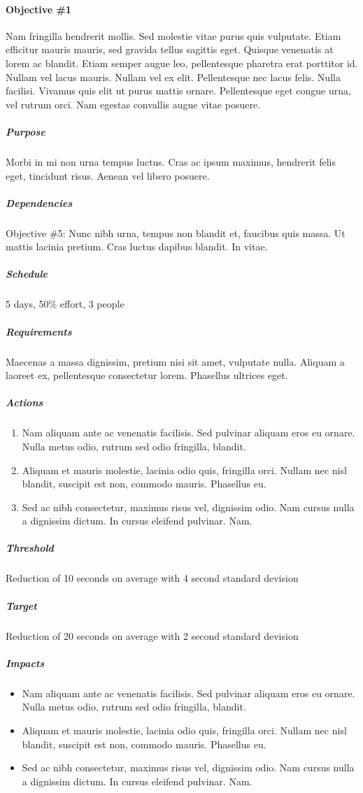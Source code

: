 		\paragraph{Objective \#1}
		Nam fringilla hendrerit mollis. Sed molestie vitae purus quis vulputate. Etiam efficitur mauris mauris, sed gravida tellus sagittis eget. Quisque venenatis at lorem ac blandit. Etiam semper augue leo, pellentesque pharetra erat porttitor id. Nullam vel lacus mauris. Nullam vel ex elit. Pellentesque nec lacus felis. Nulla facilisi. Vivamus quis elit ut purus mattis ornare. Pellentesque eget congue urna, vel rutrum orci. Nam egestas convallis augue vitae posuere.

			\subparagraph{Purpose} Morbi in mi non urna tempus luctus. Cras ac ipsum maximus, hendrerit felis eget, tincidunt risus. Aenean vel libero posuere.

			\subparagraph{Dependencies} Objective \#5: Nunc nibh urna, tempus non blandit et, faucibus quis massa. Ut mattis lacinia pretium. Cras luctus dapibus blandit. In vitae.

			\subparagraph{Schedule} 5 days, 50\% effort, 3 people

			\subparagraph{Requirements} Maecenas a massa dignissim, pretium nisi sit amet, vulputate nulla. Aliquam a laoreet ex, pellentesque consectetur lorem. Phasellus ultrices eget.

			\subparagraph{Actions} 
				\begin{enumerate}
					\item Nam aliquam ante ac venenatis facilisis. Sed pulvinar aliquam eros eu ornare. Nulla metus odio, rutrum sed odio fringilla, blandit.
					\item Aliquam et mauris molestie, lacinia odio quis, fringilla orci. Nullam nec nisl blandit, suscipit est non, commodo mauris. Phasellus eu.
					\item Sed ac nibh consectetur, maximus risus vel, dignissim odio. Nam cursus nulla a dignissim dictum. In cursus eleifend pulvinar. Nam.
				\end{enumerate}

			\subparagraph{Threshold} Reduction of 10 seconds on average with 4 second standard devision

			\subparagraph{Target} Reduction of 20 seconds on average with 2 second standard devision

			\subparagraph{Impacts} 
				\begin{itemize}
					\item Nam aliquam ante ac venenatis facilisis. Sed pulvinar aliquam eros eu ornare. Nulla metus odio, rutrum sed odio fringilla, blandit.
					\item Aliquam et mauris molestie, lacinia odio quis, fringilla orci. Nullam nec nisl blandit, suscipit est non, commodo mauris. Phasellus eu.
					\item Sed ac nibh consectetur, maximus risus vel, dignissim odio. Nam cursus nulla a dignissim dictum. In cursus eleifend pulvinar. Nam.
				\end{itemize}

